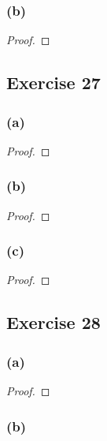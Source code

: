 \documentclass[14pt]{extarticle}
\begin{document}
\subsubsection{(b)}

\begin{proof}

\end{proof}

\subsection{Exercise 27}

\subsubsection{(a)}

\begin{proof}

\end{proof}

\subsubsection{(b)}

\begin{proof}

\end{proof}

\subsubsection{(c)}

\begin{proof}

\end{proof}

\subsection{Exercise 28}

\subsubsection{(a)}

\begin{proof}

\end{proof}

\subsubsection{(b)}
\end{document}
